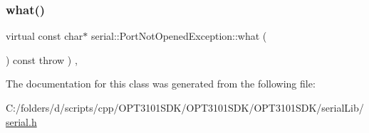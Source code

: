 \subsubsection{\texorpdfstring{what()}{what()}}
{\footnotesize\ttfamily virtual const char$\ast$ serial\+::\+Port\+Not\+Opened\+Exception\+::what (\begin{DoxyParamCaption}{ }\end{DoxyParamCaption}) const throw  ) \hspace{0.3cm}{\ttfamily [inline]}, {\ttfamily [virtual]}}



The documentation for this class was generated from the following file\+:\begin{DoxyCompactItemize}
\item 
C\+:/folders/d/scripts/cpp/\+O\+P\+T3101\+S\+D\+K/\+O\+P\+T3101\+S\+D\+K/\+O\+P\+T3101\+S\+D\+K/serial\+Lib/\mbox{\hyperlink{serial_8h}{serial.\+h}}\end{DoxyCompactItemize}
